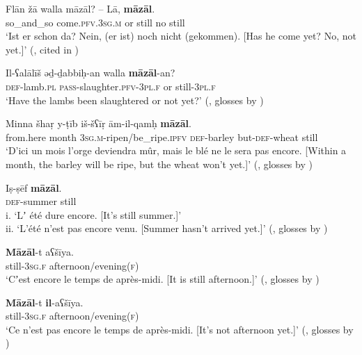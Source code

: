 \begin{exe}
	\ex\label{exAppendixTunisianNotYet1}
	\gll Flān žā walla māzāl? – Lā, \textbf{māzāl}.\\
	so\_and\_so come.\textsc{pfv}.3\textsc{sg}.\textsc{m} or still {} no still\\
	\glt \lq Ist er schon da? Nein, (er ist) noch nicht (gekommen). [Has he come yet? No, not yet.]\rq{ }(\cite[650]{Singer1984}, cited in \cite{FischerEtAlTunisian})
	
	\ex\label{exAppendixTunisianNotYet2}
	\gll Il-ʕalālīš ǝḏ-ḏabbiḥ-an walla \textbf{māzāl}-an?\\
		\textsc{def}-lamb.\textsc{pl} \textsc{pass}-slaughter.\textsc{pfv}-3\textsc{pl}.\textsc{f} or still-3\textsc{pl}.\textsc{f}\\
		\glt \lq Have the lambs been slaughtered or not yet?\rq{ }(\cite[110–111]{RittBenmimoun2011}, glosses by \cite{FischerEtAlTunisian})		
		
	\ex \label{exAppendixTunisianNotYet3}
	\gll Minna šhaṛ y-ṭīb iš-šʕīṛ ām-il-qamḥ \textbf{māzāl}.\\
	from.here month 3\textsc{sg}.\textsc{m}-ripen/be\_ripe.\textsc{ipfv} \textsc{def}-barley but-\textsc{def}-wheat still\\
	\glt \lq D’ici un mois l’orge deviendra mûr, mais le blé ne le sera pas encore. [Within a month, the barley will be ripe, but the wheat won’t yet.]\rq{ }(\cite[1740]{MarcaisGuiga19581961}, glosses by \cite{FischerEtAlTunisian})

	\ex\label{exAppendixTunisianNotYet4}
	\gll Iṣ-ṣēf \textbf{māzāl}.\\
	\textsc{def}-summer still\\
	\glt i.\phantom{i} \lq Lʼ été dure encore. [It’s still summer.]\rq\\
	ii. \lq L’été n’est pas encore venu. [Summer hasn’t arrived yet.]\rq{ }(\cite[1741]{MarcaisGuiga19581961}, glosses by \cite{FischerEtAlTunisian})
		
	\ex\label{exAppendixTunisianNotYet5}
	\gll \textbf{Māzāl}-t aʕšīya.\\
	still-3\textsc{sg}.\textsc{f} afternoon/evening(\textsc{f})\\
	\glt \lq Cʼest encore le temps de après-midi. [It is still afternoon.]\rq{ }(\cite[1741]{MarcaisGuiga19581961}, glosses by \cite{FischerEtAlTunisian})
		
	\ex\label{exAppendixTunisianNotYet6}
	\gll \textbf{Māzāl}-t \textbf{il}-aʕšīya.\\
	still-3\textsc{sg}.\textsc{f} afternoon/evening(\textsc{f})\\
	\glt \lq Ce n’est pas encore le temps de après-midi. [It’s not afternoon yet.]\rq{ }(\cite[1741]{MarcaisGuiga19581961}, glosses by \cite{FischerEtAlTunisian})
\end{exe}

